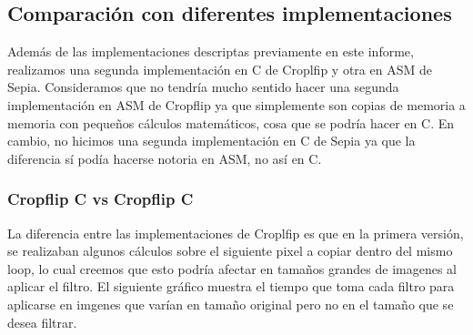 \documentclass[a4paper]{article}
\begin{document}
\begin{figure}[!ht]
    \centering
    \begin{floatrow}
    \end{floatrow}
\end{figure}

\subsection{Comparación con diferentes implementaciones}
Además de las implementaciones descriptas previamente en este informe, realizamos una segunda implementación en C de Croplfip y otra en ASM de Sepia.
Consideramos que no tendría mucho sentido hacer una segunda implementación en ASM de Cropflip ya que simplemente son copias de memoria a memoria con
pequeños cálculos matemáticos, cosa que se podría hacer en C. En cambio, no hicimos una segunda implementación en C de Sepia ya que la diferencia sí podía hacerse
notoria en ASM, no así en C.

\subsubsection{Cropflip C vs Cropflip C}
La diferencia entre las implementaciones de Croplfip es que en la primera versión, se realizaban algunos cálculos sobre el siguiente pixel a copiar
dentro del mismo loop, lo cual creemos que esto podría afectar en tamaños grandes de imagenes al aplicar el filtro. El siguiente gráfico muestra el tiempo que toma
cada filtro para aplicarse en imgenes que varían en tamaño original pero no en el tamaño que se desea filtrar.
\end{document}
